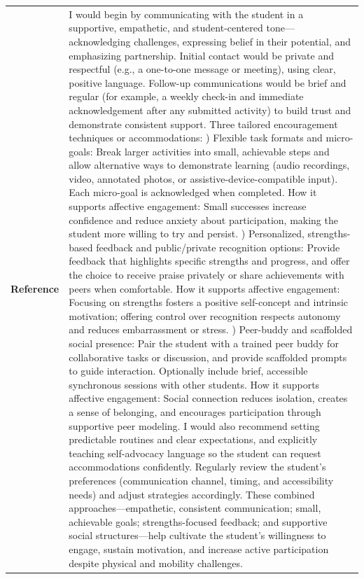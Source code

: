 \begin{longtable}{@{}l p{13cm}@{}}
  \textbf{Reference} & I would begin by communicating with the student in a supportive, empathetic, and student-centered tone---acknowledging challenges, expressing belief in their potential, and emphasizing partnership. Initial contact would be private and respectful (e.g., a one-to-one message or meeting), using clear, positive language. Follow-up communications would be brief and regular (for example, a weekly check-in and immediate acknowledgement after any submitted activity) to build trust and demonstrate consistent support. \newline Three tailored encouragement techniques or accommodations: \newline 1) Flexible task formats and micro-goals: Break larger activities into small, achievable steps and allow alternative ways to demonstrate learning (audio recordings, video, annotated photos, or assistive-device-compatible input). Each micro-goal is acknowledged when completed. How it supports affective engagement: Small successes increase confidence and reduce anxiety about participation, making the student more willing to try and persist. \newline 2) Personalized, strengths-based feedback and public/private recognition options: Provide feedback that highlights specific strengths and progress, and offer the choice to receive praise privately or share achievements with peers when comfortable. How it supports affective engagement: Focusing on strengths fosters a positive self-concept and intrinsic motivation; offering control over recognition respects autonomy and reduces embarrassment or stress. \newline 3) Peer-buddy and scaffolded social presence: Pair the student with a trained peer buddy for collaborative tasks or discussion, and provide scaffolded prompts to guide interaction. Optionally include brief, accessible synchronous sessions with other students. How it supports affective engagement: Social connection reduces isolation, creates a sense of belonging, and encourages participation through supportive peer modeling. \newline I would also recommend setting predictable routines and clear expectations, and explicitly teaching self-advocacy language so the student can request accommodations confidently. Regularly review the student's preferences (communication channel, timing, and accessibility needs) and adjust strategies accordingly. These combined approaches---empathetic, consistent communication; small, achievable goals; strengths-focused feedback; and supportive social structures---help cultivate the student's willingness to engage, sustain motivation, and increase active participation despite physical and mobility challenges.      \\

\end{longtable}
